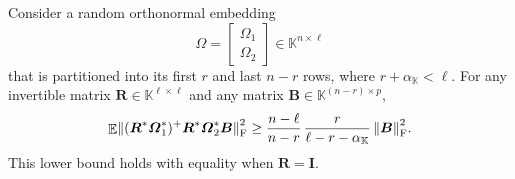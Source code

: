 \documentclass[11pt]{article}
\newcommand{\field}{\mathbb{K}}
\newcommand{\mat}[1]{\boldsymbol{#1}}
\newcommand{\norm}[1]{\mleft\| #1 \mright\|}
\newcommand{\Id}{\mathbf{I}}
\newcommand{\twobyone}[2]{%
  \begin{bmatrix}#1 \\ #2\end{bmatrix}}
\DeclareMathOperator{\expect}{\mathbb{E}}
\theoremstyle{definition}
\numberwithin{equation}{section}
\begin{document}
\begin{proposition} \label{prop:partial-isom}
    Consider a random orthonormal embedding 
    \begin{equation*}
    \mat{\varOmega} = \twobyone{\mat{\varOmega}_1}{\mat{\varOmega}_2} \in \field^{n \times \ell}
    \end{equation*}
    that is partitioned into its first $r$ and last $n-r$ rows, where $r + \alpha_{\field} < \ell$.
    For any invertible matrix $\mat{R} \in \field^{\ell \times \ell}$ and any matrix $\mat{B} \in \field^{(n-r) \times p}$, 
    \begin{equation*}
        \expect \norm{\smash{ (\mat{R}^* \mat{\varOmega}_1^*)^+ \mat{R}^* \mat{\varOmega}_2^* \mat{B}}}_{\rm F}^2 \geq \frac{n-\ell}{n-r} \, \frac{r}{\ell - r - \alpha_\field} \, \norm{\mat{B}}_{\rm F}^2.
    \end{equation*}
    This lower bound holds with equality when $\mat{R} = \Id$.
\end{proposition}
\end{document}
